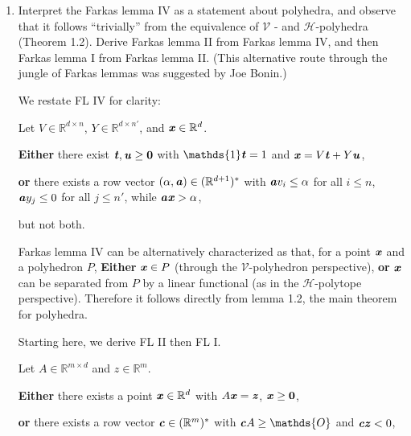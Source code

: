 \documentclass{article}
\begin{document}
\begin{enumerate}
\begin{solution}


\end{solution}

\item Interpret the Farkas lemma IV as a statement about polyhedra, and observe that it follows “trivially” from the equivalence of $\mathcal{V}$ - and $\mathcal{H}$-polyhedra (Theorem 1.2).  
Derive Farkas lemma II from Farkas lemma IV, and then Farkas lemma I from Farkas lemma II.  
(This alternative route through the jungle of Farkas lemmas was suggested by Joe Bonin.)

\smallskip
We restate FL IV for clarity:

\begin{lemma*}[FL IV]
Let $V\in\mathbb{R}^{d\times n}$, $Y\in\mathbb{R}^{d\times n'}$, and $\textbf{\textit{x}}\in\mathbb{R}^d$.

\textbf{Either} there exist $\textbf{\textit{t}},\textbf{\textit{u}}\ge \textbf{0}$ with $\mathds{1}\bi{t}=1$ and $\textbf{\textit{x}}=V\textbf{\textit{t}}+Y\textbf{\textit{u}}$,

\textbf{or} there exists a row vector $(\alpha, \textbf{\textit{a}}) \in (\mathbb{R}^{d+1})^*$ with 
$\textbf{\textit{a}}v_i \le \alpha$ for all $i \le n$, $\textbf{\textit{a}} y_j \le 0$ for all $j \le n'$,
while $\textbf{\textit{a}}\textbf{\textit{x}} > \alpha$,

but not both.
\end{lemma*}

\begin{solution}

Farkas lemma IV can be alternatively characterized as that, for a point $\textbf{\textit{x}}$ and a polyhedron $P$, \textbf{Either} $\textbf{\textit{x}} \in P$ (through the $\mathcal{V}$-polyhedron perspective), \textbf{or} $\textbf{\textit{x}}$ can be separated from $P$ by a linear functional (as in the $\mathcal{H}$-polytope perspective). Therefore it follows directly from lemma 1.2, the main theorem for polyhedra.

\smallskip
Starting here, we derive FL II then FL I.

\begin{proposition*}[FL II, from FL IV]
Let $A\in\mathbb{R}^{m\times d}$ and $z\in\mathbb{R}^m$.

\textbf{Either} there exists a point $\textbf{\textit{x}}\in\mathbb{R}^d$ with 
$A\textbf{\textit{x}}=\textbf{\textit{z}}$, $\textbf{\textit{x}}\ge \textbf{0}$,

\textbf{or} there exists a row vector $\textbf{\textit{c}}\in(\mathbb{R}^m)^*$ with 
$\bi{c}A\ge \mathds{O}$ and $\textbf{\textit{cz}}<0$,


\end{proposition*}
\end{solution}
\end{enumerate}
\end{document}
